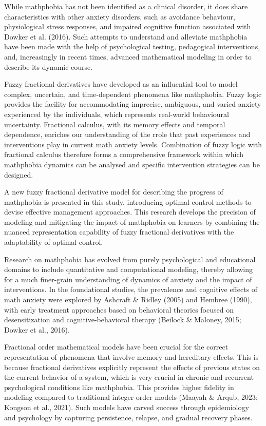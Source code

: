 \documentclass[10pt]{NSP1}
\begin{document}
While mathphobia has not been identified as a clinical disorder, it does share characteristics with other anxiety disorders, such as avoidance behaviour, physiological stress responses, and impaired cognitive function associated with Dowker et al. (2016). Such attempts to understand and alleviate mathphobia have been made with the help of psychological testing, pedagogical interventions, and, increasingly in recent times, advanced mathematical modeling in order to describe its dynamic course.

Fuzzy fractional derivatives have developed as an influential tool to model complex, uncertain, and time-dependent phenomena like mathphobia. Fuzzy logic provides the facility for accommodating imprecise, ambiguous, and varied anxiety experienced by the individuals, which represents real-world behavioural uncertainty. Fractional calculus, with its memory effects and temporal dependence, enriches our understanding of the rrole that past experiences and interventions play in current math anxiety levels. Combination of fuzzy logic with fractional calculus therefore forms a comprehensive framework within which mathphobia dynamics can be analysed and specific intervention strategies can be designed.

A new fuzzy fractional derivative model for describing the progress of mathphobia is presented in this study, introducing optimal control methods to devise effective management approaches. This research develops the precision of modeling and mitigating the impact of mathphobia on learners by combining the nuanced representation capability of fuzzy fractional derivatives with the adaptability of optimal control.

\par\medskip{}\smallskip

Research on mathphobia has evolved from purely psychological and educational domains to include quantitative and computational modeling, thereby allowing for a much finer-grain understanding of dynamics of anxiety and the impact of interventions. In the foundational studies, the prevalence and cognitive effects of math anxiety were explored by Ashcraft \& Ridley (2005) and Hembree (1990), with early treatment approaches based on behavioral theories focused on desensitization and cognitive-behavioral therapy (Beilock \& Maloney, 2015; Dowker et al., 2016).

Fractional order mathematical models have been crucial for the correct representation of phenomena that involve memory and hereditary effects. This is because fractional derivatives explicitly represent the effects of previous states on the current behavior of a system, which is very crucial in chronic and recurrent psychological conditions like mathphobia. This provides higher fidelity in modeling compared to traditional integer-order models (Maayah \& Arqub, 2023; Kongson et al., 2021). Such models have carved success through epidemiology and psychology by capturing persistence, relapse, and gradual recovery phases.
\end{document}
